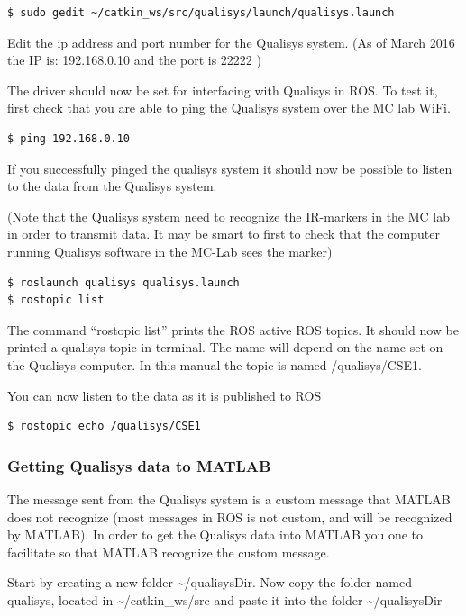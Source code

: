 \documentclass[a4paper,english]{report}
\begin{document}
\begin{verbatim}$ sudo gedit ~/catkin_ws/src/qualisys/launch/qualisys.launch\end{verbatim}

Edit the ip address and port number for the Qualisys system. (As of March 2016 the IP is: 192.168.0.10 and the port is 22222 )

The driver should now be set for interfacing with Qualisys in ROS. To test it, first check that you are able to ping the Qualisys system over the MC lab WiFi.

\begin{verbatim}$ ping 192.168.0.10\end{verbatim}

If you successfully pinged the qualisys system it should now be possible to listen to the data from the Qualisys system.

(Note that the Qualisys system need to recognize the IR-markers in the MC lab in order to transmit data. It may be smart to first to check that the computer running Qualisys software in the MC-Lab sees the marker)

\begin{verbatim}$ roslaunch qualisys qualisys.launch
$ rostopic list\end{verbatim}

The command ``rostopic list'' prints the ROS active ROS topics. It should now be printed a qualisys topic in terminal. The name will depend on the name set on the Qualisys computer. In this manual the topic is named /qualisys/CSE1.

You can now listen to the data as it is published to ROS

\begin{verbatim}$ rostopic echo /qualisys/CSE1\end{verbatim}

\subsubsection{Getting Qualisys data to MATLAB}

The message sent from the Qualisys system is a custom message that MATLAB does not recognize (most messages in ROS is not custom, and will be recognized by MATLAB). In order to get the Qualisys data into MATLAB you one to facilitate so that MATLAB recognize the custom message.

Start by creating a new folder \textasciitilde{}/qualisysDir. Now copy the folder named qualisys, located in \textasciitilde{}/catkin\_ws/src and paste it into the folder \textasciitilde{}/qualisysDir
\end{document}
